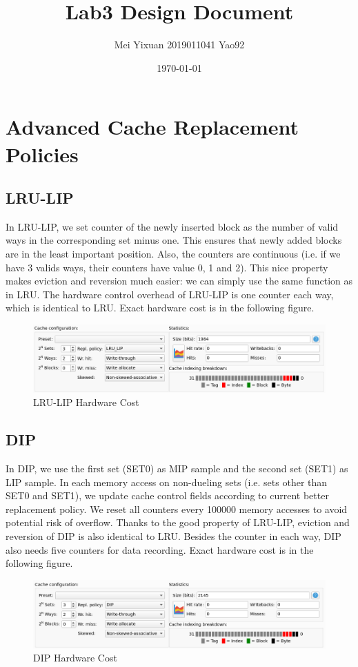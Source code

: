 \documentclass[utf8]{article}
\title{\bf\huge Lab3 Design Document}
\author{Mei Yixuan 2019011041 Yao92}
\date{\today}
\begin{document}
\maketitle

\section{Advanced Cache Replacement Policies}

\subsection{LRU-LIP}
In LRU-LIP, we set counter of the newly inserted block as the number of valid ways in the corresponding set minus one. This ensures that newly added blocks are in the least important position. Also, the counters are continuous (i.e. if we have 3 valids ways, their counters have value 0, 1 and 2). This nice property makes eviction and reversion much easier: we can simply use the same function as in LRU. The hardware control overhead of LRU-LIP is one counter each way, which is identical to LRU. Exact hardware cost is in the following figure.
\begin{figure}[h]
	\centering
	\includegraphics[width=0.7\linewidth]{screenshot001}
	\caption{LRU-LIP Hardware Cost}
	\label{fig:screenshot001}
\end{figure}


\subsection{DIP}
In DIP, we use the first set (SET0) as MIP sample and the second set (SET1) as LIP sample. In each memory access on non-dueling sets (i.e. sets other than SET0 and SET1), we update cache control fields according to current better replacement policy. We reset all counters every 100000 memory accesses to avoid potential risk of overflow. Thanks to the good property of LRU-LIP, eviction and reversion of DIP is also identical to LRU. Besides the counter in each way, DIP also needs five counters for data recording. Exact hardware cost is in the following figure.
\begin{figure}[h]
	\centering
	\includegraphics[width=0.7\linewidth]{screenshot002}
	\caption{DIP Hardware Cost}
	\label{fig:screenshot002}
\end{figure}
\newpage
\end{document}
